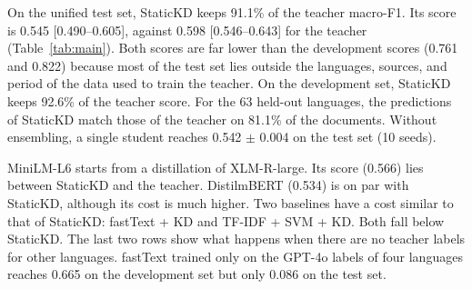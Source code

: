 \documentclass[journal]{IEEEtran}
\begin{document}
On the unified test set, StaticKD keeps 91.1\% of the teacher macro-F1. Its score is 0.545 [0.490--0.605], against 0.598 [0.546--0.643] for the teacher (Table~\ref{tab:main}). Both scores are far lower than the development scores (0.761 and 0.822) because most of the test set lies outside the languages, sources, and period of the data used to train the teacher. On the development set, StaticKD keeps 92.6\% of the teacher score. For the 63 held-out languages, the predictions of StaticKD match those of the teacher on 81.1\% of the documents. Without ensembling, a single student reaches 0.542 $\pm$ 0.004 on the test set (10 seeds).

MiniLM-L6 starts from a distillation of XLM-R-large. Its score (0.566) lies between StaticKD and the teacher. DistilmBERT (0.534) is on par with StaticKD, although its cost is much higher. Two baselines have a cost similar to that of StaticKD: fastText + KD and TF-IDF + SVM + KD. Both fall below StaticKD. The last two rows show what happens when there are no teacher labels for other languages. fastText trained only on the GPT-4o labels of four languages reaches 0.665 on the development set but only 0.086 on the test set.
\end{document}
